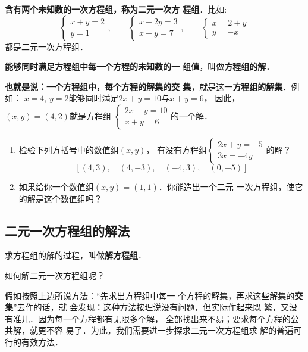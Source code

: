 \textbf{含有两个未知数的一次方程组，称为二元一次方
程组}．比如:
\[\begin{cases}
    x+y=2\\
    y=1 
 \end{cases},\qquad \begin{cases}
     x-2y=3\\
     x+y=7
 \end{cases},\qquad \begin{cases}
    x=2+y\\
    y=-x
\end{cases}\]   
都是二元一次方程组．

\textbf{能够同时满足方程组中每一个方程的未知数的一
组值}，叫做\textbf{方程组的解}．

\textbf{也就是说：一个方程组中，每个方程的解集的交
集}，就是这一\textbf{方程组的解集}．例如：
    $x=4$,  $y=2$能够同时满足$2x+y=10$与$x+y=6$，
因此，$(x,y)=(4,2)$就是方程组
$\begin{cases}
    2x+y=10\\
    x+y=6 
 \end{cases}$的一个解．

\begin{ex}
\begin{enumerate}
    \item 检验下列方括号中的数值组$(x,y)$，
    有没有方程组$\begin{cases}
        2x+y=-5\\
        3x=-4y 
     \end{cases}$的解？
    \[[(4,3),\quad (4,-3),\quad (-4,3), \quad (0,-5)  ] \]

    \item 如果给你一个数值组$(x,  y) = (1,1)$．你能造出一个二元
    一次方程组，使它的解是这个数值组吗？
\end{enumerate}
\end{ex}

\subsection{二元一次方程组的解法}
    求方程组的解的过程，叫做\textbf{解方程组}．

    如何解二元一次方程组呢？

    假如按照上边所说方法：“先求出方程组中每一
个方程的解集，再求这些解集的\textbf{交集}”去作的话，就
会发现：这种方法按理说没有问题，但实际作起来既
繁，又没有准儿．因为每一个方程都有无限多个解，
全部找出来不易；要求每个方程的公共解，就更不容
易了．为此，我们需要进一步探求二元一次方程组求
解的普遍可行的有效方法．

